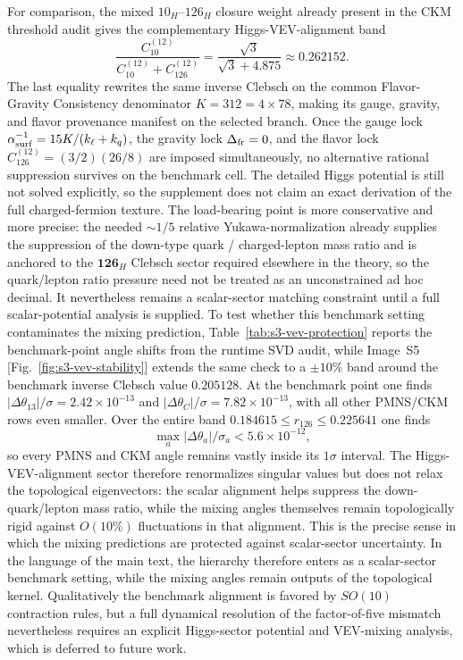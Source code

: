 \documentclass[11pt]{article}
\begin{document}
For comparison, the mixed $10_H$--$126_H$ closure weight already present in the CKM threshold audit gives the complementary Higgs-VEV-alignment band
\begin{equation}
 \frac{C_{10}^{(12)}}{C_{10}^{(12)}+C_{126}^{(12)}}
 =
 \frac{\sqrt3}{\sqrt3+4.875}
 \approx 0.262152.
\end{equation}
The last equality rewrites the same inverse Clebsch on the common Flavor-Gravity Consistency denominator $K=312=4\times78$, making its gauge, gravity, and flavor provenance manifest on the selected branch. Once the gauge lock $\alpha^{-1}_{\rm surf}=15K/(k_{\ell}+k_q)$, the gravity lock $\Delta_{\rm fr}=0$, and the flavor lock $C_{126}^{(12)}=(3/2)(26/8)$ are imposed simultaneously, no alternative rational suppression survives on the benchmark cell. The detailed Higgs potential is still not solved explicitly, so the supplement does not claim an exact derivation of the full charged-fermion texture. The load-bearing point is more conservative and more precise: the needed $\sim1/5$ relative Yukawa-normalization already supplies the suppression of the down-type quark / charged-lepton mass ratio and is anchored to the $\mathbf{126}_H$ Clebsch sector required elsewhere in the theory, so the quark/lepton ratio pressure need not be treated as an unconstrained ad hoc decimal. It nevertheless remains a scalar-sector matching constraint until a full scalar-potential analysis is supplied. To test whether this benchmark setting contaminates the mixing prediction, Table~\ref{tab:s3-vev-protection} reports the benchmark-point angle shifts from the runtime SVD audit, while Image~S5 [Fig.~\ref{fig:s3-vev-stability}] extends the same check to a $\pm10\%$ band around the benchmark inverse Clebsch value $0.205128$. At the benchmark point one finds $|\Delta\theta_{13}|/\sigma=2.42\times10^{-13}$ and $|\Delta\theta_C|/\sigma=7.82\times10^{-13}$, with all other PMNS/CKM rows even smaller. Over the entire band $0.184615\le r_{126}\le0.225641$ one finds
\begin{equation}
 \max_a |\Delta\theta_a|/\sigma_a < 5.6\times10^{-12},
\end{equation}
so every PMNS and CKM angle remains vastly inside its $1\sigma$ interval. The Higgs-VEV-alignment sector therefore renormalizes singular values but does not relax the topological eigenvectors: the scalar alignment helps suppress the down-quark/lepton mass ratio, while the mixing angles themselves remain topologically rigid against $O(10\%)$ fluctuations in that alignment. This is the precise sense in which the mixing predictions are protected against scalar-sector uncertainty. In the language of the main text, the hierarchy therefore enters as a scalar-sector benchmark setting, while the mixing angles remain outputs of the topological kernel. Qualitatively the benchmark alignment is favored by $SO(10)$ contraction rules, but a full dynamical resolution of the factor-of-five mismatch nevertheless requires an explicit Higgs-sector potential and VEV-mixing analysis, which is deferred to future work.
\end{document}

